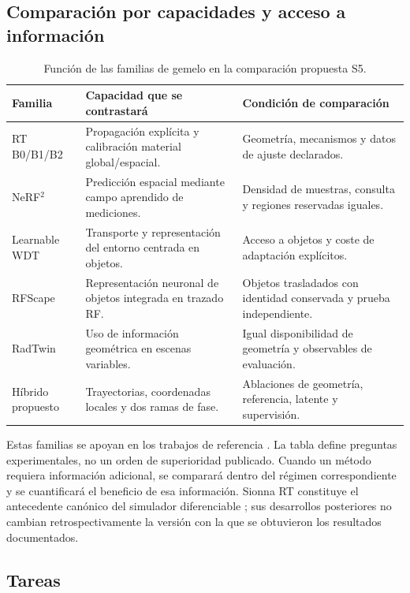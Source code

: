 \subsection{Comparación por capacidades y acceso a información}

\begin{table}[htbp]
\centering\small
\caption{Función de las familias de gemelo en la comparación propuesta S5.}
\label{tab:twin_capability_comparison}
\begin{tabularx}{\textwidth}{P{2.8cm}L L}
\toprule
Familia & Capacidad que se contrastará & Condición de comparación\\
\midrule
RT B0/B1/B2 & Propagación explícita y calibración material global/espacial. & Geometría, mecanismos y datos de ajuste declarados.\\
NeRF$^2$ & Predicción espacial mediante campo aprendido de mediciones. & Densidad de muestras, consulta y regiones reservadas iguales.\\
Learnable WDT & Transporte y representación del entorno centrada en objetos. & Acceso a objetos y coste de adaptación explícitos.\\
RFScape & Representación neuronal de objetos integrada en trazado RF. & Objetos trasladados con identidad conservada y prueba independiente.\\
RadTwin & Uso de información geométrica en escenas variables. & Igual disponibilidad de geometría y observables de evaluación.\\
Híbrido propuesto & Trayectorias, coordenadas locales y dos ramas de fase. & Ablaciones de geometría, referencia, latente y supervisión.\\
\bottomrule
\end{tabularx}
\end{table}

Estas familias se apoyan en los trabajos de referencia \citep{Zhao2023NeRF2,Jiang2025LearnableWDT,
Chen2025RFScape,Zhang2026RadTwin}. La tabla define preguntas experimentales, no
un orden de superioridad publicado. Cuando un método requiera información adicional,
se comparará dentro del régimen correspondiente y se cuantificará el beneficio de
esa información. Sionna RT constituye el antecedente canónico del simulador diferenciable
\citep{Hoydis2023SionnaRT}; sus desarrollos posteriores no cambian retrospectivamente
la versión con la que se obtuvieron los resultados documentados.

\subsection{Tareas}

